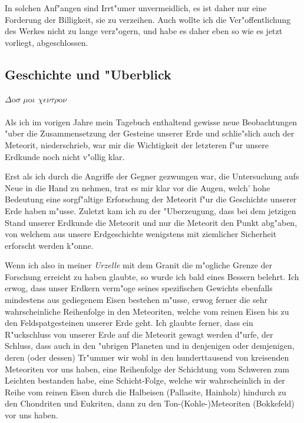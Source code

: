 \documentclass[a4paper, 11pt, oneside]{article}
\begin{document}
In solchen Anf"angen sind Irrt"umer unvermeidlich, es ist daher nur eine Forderung der Billigkeit, sie zu verzeihen. Auch wollte ich die Ver"offentlichung des Werkes nicht zu lange verz"ogern, und habe es daher eben so wie es jetzt vorliegt, abgeschlossen.
\clearpage
\subsection{Geschichte und "Uberblick}
$\Delta$o$\sigma$ $\mu$o$\iota$ $\chi\epsilon\nu\tau\rho$o$\nu$%
\paragraph{}
Als ich im vorigen Jahre mein Tagebuch enthaltend gewisse neue Beobachtungen "uber die Zusammensetzung der Gesteine unserer Erde und schlie"slich auch der Meteorit, niederschrieb, war mir die Wichtigkeit der letzteren f"ur unsere Erdkunde noch nicht v"ollig klar.

Erst als ich durch die Angriffe der Gegner gezwungen war, die Untersuchung aufs Neue in die Hand zu nehmen, trat es mir klar vor die Augen, welch' hohe Bedeutung eine sorgf"altige Erforschung der Meteorit f"ur die Geschichte unserer Erde haben m"usse. Zuletzt kam ich zu der "Uberzeugung, dass bei dem jetzigen Stand unserer Erdkunde die Meteorit und nur die Meteorit den Punkt abg"aben, von welchem aus unsere Erdgeschichte wenigstens mit ziemlicher Sicherheit erforscht werden k"onne.

Wenn ich also in meiner \emph{Urzelle} mit dem Granit die m"ogliche Grenze der Forschung erreicht zu haben glaubte, so wurde ich bald eines Bessern belehrt. Ich erwog, dass unser Erdkern verm"oge seines spezifischen Gewichts ebenfalls mindestens aus gediegenem Eisen bestehen m"usse, erwog ferner die sehr wahrscheinliche Reihenfolge in den Meteoriten, welche vom reinen Eisen bis zu den Feldspatgesteinen unserer Erde geht. Ich glaubte ferner, dass ein R"uckschluss von unserer Erde auf die Meteorit gewagt werden d"urfe, der Schluss, dass auch in den "ubrigen Planeten und in denjenigen oder demjenigen, deren (oder dessen) Tr"ummer wir wohl in den hunderttausend von kreisenden Meteoriten vor uns haben, eine Reihenfolge der Schichtung vom Schweren zum Leichten bestanden habe, eine Schicht-Folge, welche wir wahrscheinlich in der Reihe vom reinen Eisen durch die Halbeisen (Pallasite, Hainholz) hindurch zu den Chondriten und Eukriten, dann zu den Ton-(Kohle-)Meteoriten (Bokkefeld) vor uns haben.
\end{document}
